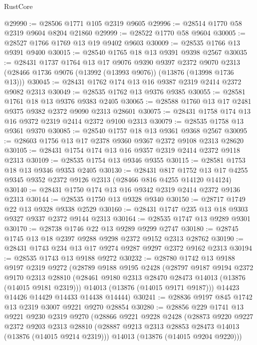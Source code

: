 \begin{lexlean}{RustCore}
\begin{coremodule}
@29990 := @28506 @1771 @105 @2319 @9605
@29996 := @28514 @1770 @58 @2319 @9604 @8204 @21860
@29999 := @28522 @1770 @58 @9604
@30005 := @28527 @1766 @1769 @13 @19 @9402 @9603
@30009 := @28535 @1766 @13 @9391 @9400
@30015 := @28540 @1765 @18 @13 @9391 @9398 @2567
@30035 := @28431
    @1737
    @1764
    @13
    @17
    @9076
    @9390
    @9397
    @2372
    @9070
    @2313
    (@28466 @1736 @9076 (@13992 (@13993 @9076)) (@13876 (@13998 @1736 @13)))
@30045 := @28431 @1762 @174 @13 @16 @9387 @2319 @2414 @2372 @9082 @2313
@30049 := @28535 @1762 @13 @9376 @9385
@30055 := @28581 @1761 @18 @13 @9376 @9383 @2405
@30065 := @28588 @1760 @13 @17 @2481 @9375 @9382 @2372 @9090 @2313 @28601
@30075 := @28431 @1758 @174 @13 @16 @9372 @2319 @2414 @2372 @9100 @2313
@30079 := @28535 @1758 @13 @9361 @9370
@30085 := @28540 @1757 @18 @13 @9361 @9368 @2567
@30095 := @28603 @1756 @13 @17 @2378 @9360 @9367 @2372 @9108 @2313 @28620
@30105 := @28431 @1754 @174 @13 @16 @9357 @2319 @2414 @2372 @9118 @2313
@30109 := @28535 @1754 @13 @9346 @9355
@30115 := @28581 @1753 @18 @13 @9346 @9353 @2405
@30130 := @28431
    @817
    @1752
    @13
    @17
    @4255
    @9345
    @9352
    @2372
    @9126
    @2313
    (@28466 @816 @4255 @14120 @14124)
@30140 := @28431 @1750 @174 @13 @16 @9342 @2319 @2414 @2372 @9136 @2313
@30144 := @28535 @1750 @13 @9328 @9340
@30150 := @28717 @1749 @22 @13 @9328 @9338 @2529
@30160 := @28431 @1747 @235 @13 @18 @9303 @9327 @9337 @2372 @9144 @2313
@30164 := @28535 @1747 @13 @9289 @9301
@30170 := @28738 @1746 @22 @13 @9289 @9299 @2747
@30180 := @28745 @1745 @13 @18 @2397 @9288 @9298 @2372 @9152 @2313 @28762
@30190 := @28431 @1743 @234 @13 @17 @9274 @9287 @9297 @2372 @9162 @2313
@30194 := @28535 @1743 @13 @9188 @9272
@30232 := @28780
    @1742
    @13
    @9188
    @9197
    @2319
    @9272
    (@28789
      @9188
      @9195
      @2428
      (@28797
        @9187
        @9194
        @2372
        @9170
        @2313
        @28810
        (@28461 @9180 @2313 @28470 @28473 @14013 (@13876 (@14015 @9181 @2319)))
        @14013
        (@13876 (@14015 @9171 @9187)))
      @14423
      @14426
      @14429
      @14433
      @14438
      @14444)
@30241 := @28836 @9197 @845 @1742 @13 @2319 @3007 @9221 @9270 @28854
@30280 := @28856
    @229
    @1741
    @13
    @9221
    @9230
    @2319
    @9270
    (@28866
      @9221
      @9228
      @2428
      (@28873
        @9220
        @9227
        @2372
        @9203
        @2313
        @28810
        (@28887 @9213 @2313 @28853 @28473 @14013 (@13876 (@14015 @9214 @2319)))
        @14013
        (@13876 (@14015 @9204 @9220)))

\end{coremodule}
\end{lexlean}
